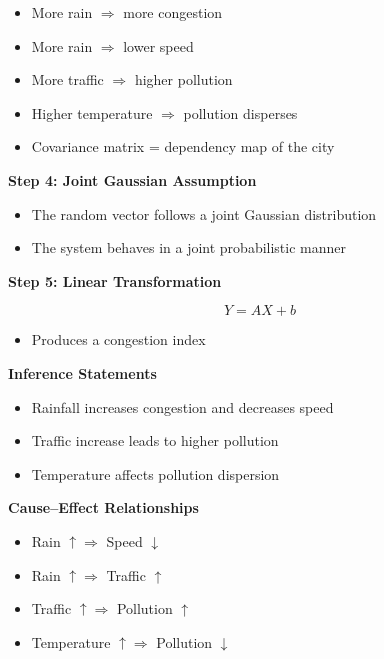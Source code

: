 ﻿\documentclass[12pt]{article}
\begin{document}
\begin{itemize}
\item More rain $\Rightarrow$ more congestion
\item More rain $\Rightarrow$ lower speed
\item More traffic $\Rightarrow$ higher pollution
\item Higher temperature $\Rightarrow$ pollution disperses
\item Covariance matrix = dependency map of the city
\end{itemize}




\textbf{Step 4: Joint Gaussian Assumption}


\begin{itemize}
\item The random vector follows a joint Gaussian distribution
\item The system behaves in a joint probabilistic manner
\end{itemize}




\textbf{Step 5: Linear Transformation}


\[
Y = AX + b
\]


\begin{itemize}
\item Produces a congestion index
\end{itemize}




\textbf{Inference Statements}


\begin{itemize}
\item Rainfall increases congestion and decreases speed
\item Traffic increase leads to higher pollution
\item Temperature affects pollution dispersion
\end{itemize}




\textbf{Cause--Effect Relationships}


\begin{itemize}
\item Rain $\uparrow \Rightarrow$ Speed $\downarrow$
\item Rain $\uparrow \Rightarrow$ Traffic $\uparrow$
\item Traffic $\uparrow \Rightarrow$ Pollution $\uparrow$
\item Temperature $\uparrow \Rightarrow$ Pollution $\downarrow$
\end{itemize}


\end{document}
